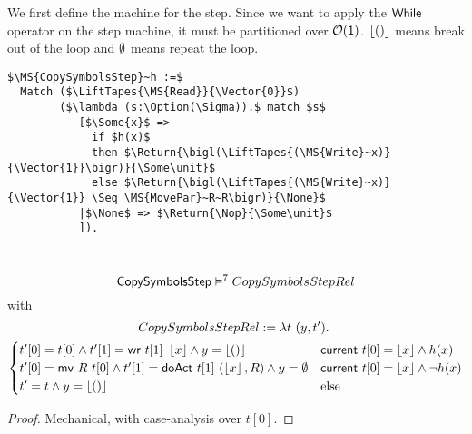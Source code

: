 We first define the machine for the step.  Since we want to apply the $\mathsf{While}$ operator on the step machine, it must be partitioned over
$\mathcal{O}(\mathsf{1})$.  $\left\lfloor {\ensuremath{\mathsf{()}}} \right\rfloor$ means break out of the loop and $\emptyset$ means repeat the loop.
\begin{definition}[$\MS{CopySymbolsStep}$]
  \label{CopySymbols_Step}
\begin{lstlisting}[style=semicoqstyle]
$\MS{CopySymbolsStep}~h :=$
  Match ($\LiftTapes{\MS{Read}}{\Vector{0}}$)
        ($\lambda (s:\Option(\Sigma)).$ match $s$
           [$\Some{x}$ =>
             if $h(x)$
             then $\Return{\bigl(\LiftTapes{(\MS{Write}~x)}{\Vector{1}}\bigr)}{\Some\unit}$ 
             else $\Return{\bigl(\LiftTapes{(\MS{Write}~x)}{\Vector{1}} \Seq \MS{MovePar}~R~R\bigr)}{\None}$ 
           |$\None$ => $\Return{\Nop}{\Some\unit}$ 
           ]).
\end{lstlisting}
\end{definition}

\begin{lemma}
  \label{lem:CopySymbols_Step_Sem}
  ~
  \[
    \mathsf{CopySymbolsStep} \mathrel{\vDash^{7}} CopySymbolsStepRel
  \]
  with
  \small
  \begin{multline*}
    CopySymbolsStepRel := \lambda t~(y, t').~\\
    \begin{cases}
      t'[0] = t[0]           \land t'[1]=\mathsf{wr}~t[1]~\left\lfloor {x} \right\rfloor         \land y=\left\lfloor {\ensuremath{\mathsf{()}}} \right\rfloor & \mathsf{current}~t[0]=\left\lfloor {x} \right\rfloor \land       h(x) \\
      t'[0] = \mathsf{mv}~R~t[0] \land t'[1]=\mathsf{doAct}~t[1]~(\left\lfloor {x} \right\rfloor, R) \land y=\emptyset      & \mathsf{current}~t[0]=\left\lfloor {x} \right\rfloor \land \lnot h(x) \\
      t' = t \land y=\left\lfloor {\ensuremath{\mathsf{()}}} \right\rfloor                                                           & \text{else}
    \end{cases}
  \end{multline*}
\end{lemma}
\begin{proof}
  Mechanical, with case-analysis over $t[0]$.
\end{proof}


